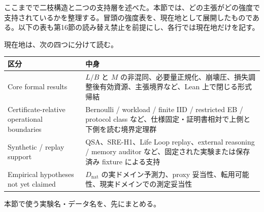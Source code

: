 \documentclass[12pt,a4paper]{article}
\begin{document}
ここまでで二枝構造と二つの支持層を述べた。本節では、どの主張がどの強度で支持されているかを整理する。冒頭の強度表を、現在地として展開したものである。以下の表も第16節の読み替え禁止を前提にし、各行では現在地だけを記す。

現在地は、次の四つに分けて読む。

{\def\LTcaptype{table} %
\begin{longtable}[]{@{}
  >{\raggedright\arraybackslash}p{}
  >{\raggedright\arraybackslash}p{}@{}}
\toprule\noalign{}
\begin{minipage}[b]{\linewidth}\raggedright
区分
\end{minipage} & \begin{minipage}[b]{\linewidth}\raggedright
中身
\end{minipage} \\
\midrule\noalign{}
\endhead
\bottomrule\noalign{}
\endlastfoot
Core formal results & \(L/B\) と \(M\) の非混同、必要量正規化、崩壊圧、損失調整後有効資源、主張境界など、Lean 上で閉じる形式帰結 \\
Certificate-relative operational boundaries & Bernoulli / workload / finite IID / restricted EB / protocol class など、仕様固定・証明書相対で上側と下側を読む境界定理群 \\
Synthetic / replay support & QSA、SRE-H1、Life Loop replay、external reasoning / memory auditor など、固定された実験または保存済み fixture による支持 \\
Empirical hypotheses not yet claimed & \(D_{\mathrm{nat}}\) の実ドメイン予測力、proxy 妥当性、転用可能性、現実ドメインでの測定妥当性 \\
\end{longtable}
}

本節で使う実験名・データ名を、先にまとめる。
\end{document}
